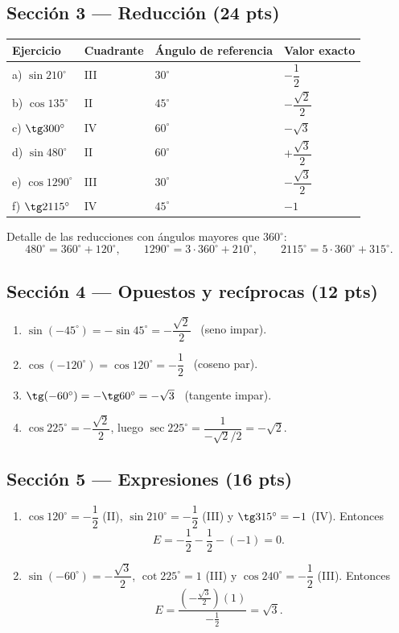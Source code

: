 \documentclass[12pt, letterpaper]{article}
\providecommand{\sen}{\sin}
\begin{document}
\subsection*{Sección 3 — Reducción (24 pts)}
\begin{center}
\renewcommand{\arraystretch}{1.7}
\setlength{\tabcolsep}{9pt}
\begin{tabular}{@{}llll@{}}
  \toprule
  \textbf{Ejercicio} & \textbf{Cuadrante} & \textbf{Ángulo de referencia} & \textbf{Valor exacto} \\
  \midrule
  a) $\sen 210^\circ$  & III & $30^\circ$ & $-\dfrac12$ \\
  b) $\cos 135^\circ$  & II  & $45^\circ$ & $-\dfrac{\sqrt{2}}{2}$ \\
  c) $\tg 300^\circ$   & IV  & $60^\circ$ & $-\sqrt{3}$ \\
  d) $\sen 480^\circ$  & II  & $60^\circ$ & $+\dfrac{\sqrt{3}}{2}$ \\
  e) $\cos 1290^\circ$ & III & $30^\circ$ & $-\dfrac{\sqrt{3}}{2}$ \\
  f) $\tg 2115^\circ$  & IV  & $45^\circ$ & $-1$ \\
  \bottomrule
\end{tabular}
\end{center}

\noindent Detalle de las reducciones con ángulos mayores que $360^\circ$:
\[
  480^\circ=360^\circ+120^\circ,\qquad
  1290^\circ=3\cdot360^\circ+210^\circ,\qquad
  2115^\circ=5\cdot360^\circ+315^\circ.
\]

\subsection*{Sección 4 — Opuestos y recíprocas (12 pts)}
\begin{enumerate}[leftmargin=*, label=\textbf{\alph*)}]
  \item $\sen(-45^\circ)=-\sen45^\circ=-\dfrac{\sqrt{2}}{2}$ \ (seno impar).
  \item $\cos(-120^\circ)=\cos120^\circ=-\dfrac12$ \ (coseno par).
  \item $\tg(-60^\circ)=-\tg60^\circ=-\sqrt{3}$ \ (tangente impar).
  \item $\cos225^\circ=-\dfrac{\sqrt{2}}{2}$, luego
        $\sec225^\circ=\dfrac{1}{-\sqrt{2}/2}=-\sqrt{2}$.
\end{enumerate}

\subsection*{Sección 5 — Expresiones (16 pts)}
\begin{enumerate}[leftmargin=*, label=\textbf{\arabic*.}]
  \item $\cos120^\circ=-\dfrac12$ (II), $\sen210^\circ=-\dfrac12$ (III) y
        $\tg315^\circ=-1$ (IV). Entonces
        \[
          E=-\frac12-\frac12-(-1)=0.
        \]
  \item $\sen(-60^\circ)=-\dfrac{\sqrt{3}}{2}$, $\cot225^\circ=1$ (III) y
        $\cos240^\circ=-\dfrac12$ (III). Entonces
        \[
          E=\frac{\left(-\frac{\sqrt{3}}{2}\right)(1)}{-\frac12}=\sqrt{3}.
        \]
\end{enumerate}
\end{document}
